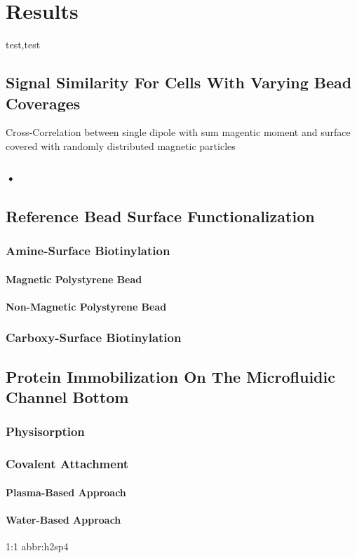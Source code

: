 \chapter{Results}
test,test

\section{Signal Similarity For Cells With Varying Bead Coverages}
Cross-Correlation between single dipole with sum magentic moment and surface covered with randomly distributed magnetic particles
\subsection{•}

\section{Reference Bead Surface Functionalization}

\subsection{Amine-Surface Biotinylation}

\subsubsection{Magnetic Polystyrene Bead}

\subsubsection{Non-Magnetic Polystyrene Bead}

\subsection{Carboxy-Surface Biotinylation}

\section{Protein Immobilization On The Microfluidic Channel Bottom}

\subsection{Physisorption}

\subsection{Covalent Attachment}

\subsubsection{Plasma-Based Approach}

\subsubsection{Water-Based Approach}
1:1 \gls{abbr:h2sp4} 